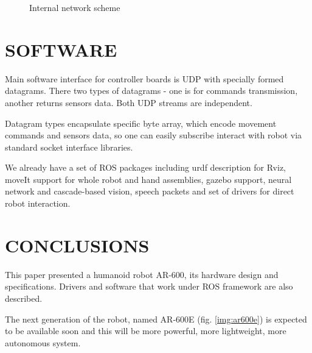 \documentclass[letterpaper, 10 pt, conference]{ieeeconf}  %
\begin{document}
   \begin{figure}[thpb]
      \centering
      \caption{Internal network scheme}
      \label{img:ethernet}
   \end{figure}
   
\section{SOFTWARE}

Main software interface for controller boards is UDP with specially formed
datagrams. There two types of datagrams - one is for commands transmission,
another returns sensors data. Both UDP streams
are independent.

Datagram types encapsulate specific byte array, which encode movement
commands and sensors data, so one can easily subscribe interact with robot via
standard socket interface libraries.

We already have a set of ROS packages including urdf description for Rviz,
moveIt support for whole robot and hand assemblies, gazebo support, neural
network and cascade-based vision, speech packets and set of drivers for direct
robot interaction.

\section{CONCLUSIONS}

This paper presented a humanoid robot AR-600, its hardware design and
specifications. Drivers and software that work under ROS framework are
also described.

The next generation of the robot, named AR-600E (fig. \ref{img:ar600e}) is
expected to be available soon and this will be more powerful, more lightweight,
more autonomous system.
\end{document}
